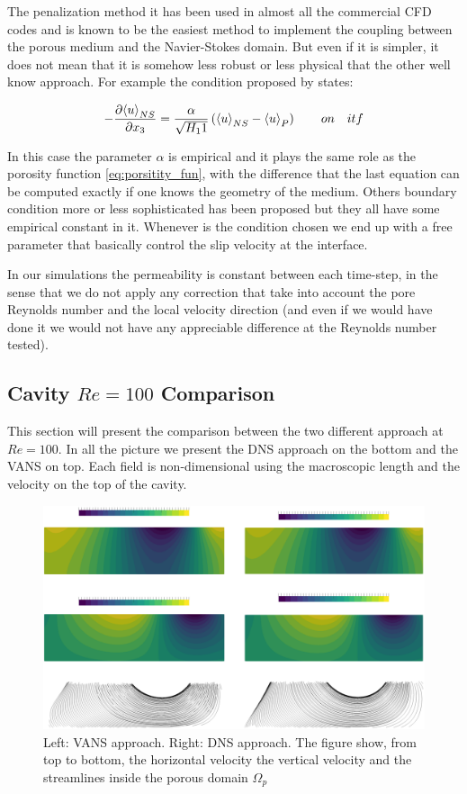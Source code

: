 The penalization method it has been used in almost all the commercial CFD codes and is known to be the easiest method to implement the coupling between the porous medium and the Navier-Stokes domain.
But even if it is simpler, it does not mean that it is somehow less robust or less physical that the other well know approach.
For example the condition proposed by \citet{beavers1967boundary} states:

\begin{equation}
	-\dfrac{\partial {\left< u \right>}_{NS}}{\partial x_3} = \dfrac{\alpha}{\sqrt{H_11}} \left( {\left< u \right>}_{NS} - {\left< u \right>}_{P} \right) \qquad on \quad itf
	\label{eq:beavjos}
\end{equation}

In this case the parameter $\alpha$ is empirical and it plays the same role as the porosity function \eqref{eq:porsitity_fun}, with the difference that the last equation can be computed exactly if one knows the geometry of the medium.
Others boundary condition more or less sophisticated has been proposed but they all have some empirical constant in it. 
Whenever is the condition chosen we end up with a free parameter that basically control the slip velocity at the interface.

In our simulations the permeability is constant between each time-step, in the sense that we do not apply any correction that take into account the pore Reynolds number and the local velocity direction (and even if we would have done it we would not have any appreciable difference at the Reynolds number tested).

\subsection{Cavity $Re=100$ Comparison}

This section will present the comparison between the two different approach at $Re=100$.
In all the picture we present the DNS approach on the bottom and the VANS on top.
Each field is non-dimensional using the macroscopic length and the velocity on the top of the cavity.

\begin{figure}[h]
	\centering
	\includegraphics[width=1\linewidth]{chapter_5/figure/re100/vans_u}
	\caption{Left: VANS approach. Right: DNS approach. The figure show, from top to bottom, the horizontal velocity the vertical velocity and the streamlines inside the porous domain $\Omega_p$}
	\label{fig:100_u}
\end{figure}

